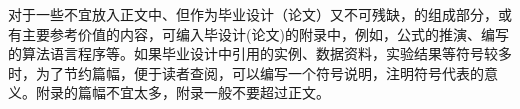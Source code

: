 \neepuappendix%
\bodystyle%
对于一些不宜放入正文中、但作为毕业设计（论文）又不可残缺，的组成部分，或有主要参考价值的内容，可编入毕设计(论文)的附录中，例如，公式的推演、编写的算法语言程序等。如果毕业设计中引用的实例、数据资料，实验结果等符号较多时，为了节约篇幅，便于读者查阅，可以编写一个符号说明，注明符号代表的意义。附录的篇幅不宜太多，附录一般不要超过正文。\par
